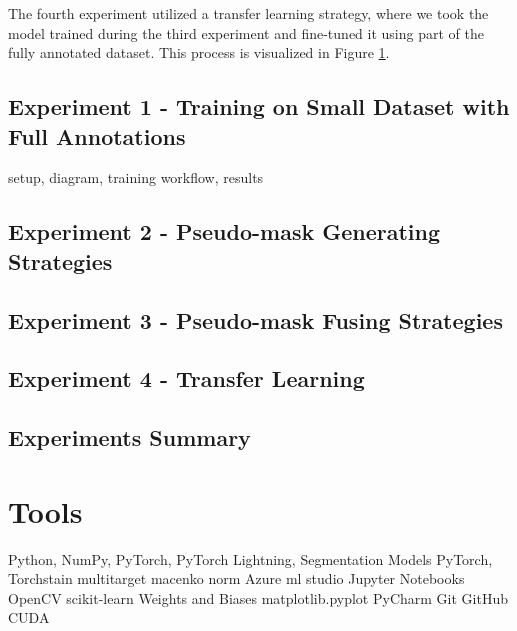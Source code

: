 The fourth experiment utilized a transfer learning strategy, where we took the model trained during the third experiment and fine-tuned it using part of the fully annotated dataset. This process is visualized in Figure \ref{}.

\subsection{Experiment 1 - Training on Small Dataset with Full Annotations}
setup, diagram, training workflow, results

\subsection{Experiment 2 - Pseudo-mask Generating Strategies}

\subsection{Experiment 3 - Pseudo-mask Fusing Strategies}

\subsection{Experiment 4 - Transfer Learning}

\subsection{Experiments Summary}

\section{Tools}
Python, 
NumPy, 
PyTorch, 
PyTorch Lightning,
Segmentation Models PyTorch, 
Torchstain multitarget macenko norm
Azure ml studio
Jupyter Notebooks
OpenCV
scikit-learn
Weights and Biases
matplotlib.pyplot
PyCharm
Git
GitHub
CUDA